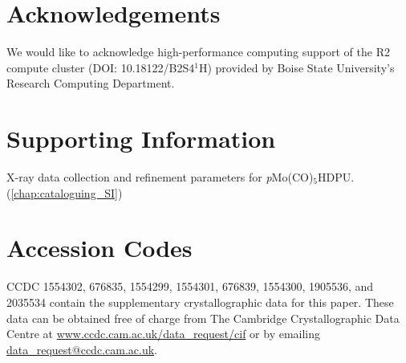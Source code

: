 \section{Acknowledgements}
We would like to acknowledge high-performance computing support of the R2 compute cluster (DOI: 10.18122/B2S4$^{1}$H) provided by Boise State University's Research Computing Department. 

\section{Supporting Information}
X-ray data collection and refinement parameters for \textit{p}Mo(CO)$_{5}$HDPU. (\autoref{chap:cataloguing_SI})

\section{Accession Codes}
CCDC 1554302, 676835, 1554299, 1554301, 676839, 1554300, 1905536, and 2035534 contain the supplementary crystallographic data for this paper. These data can be obtained free of charge from The Cambridge Crystallographic Data Centre at \url{www.ccdc.cam.ac.uk/data_request/cif} or by emailing \href{mailto:data_request@ccdc.cam.ac.uk}{data\_request@ccdc.cam.ac.uk}.
